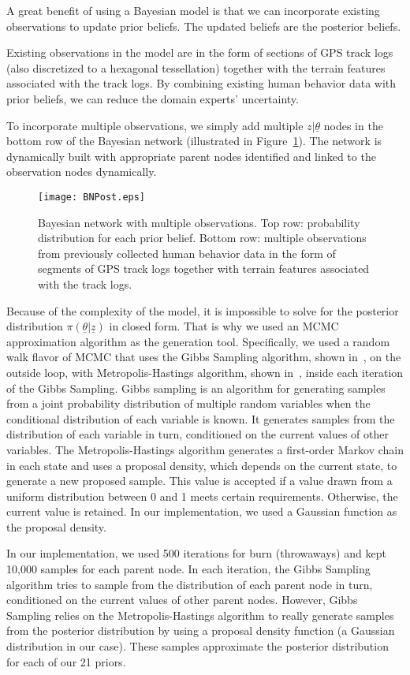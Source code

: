 \documentclass[smallextended,natbib]{svjour3}
\begin{document}
A great benefit of using a Bayesian model is that we can incorporate existing observations to update prior beliefs. The updated beliefs are the posterior beliefs.

Existing observations in the model are in the form of sections of GPS track logs (also discretized to a hexagonal tessellation) together with the terrain features associated with the track logs. By combining existing human behavior data with prior beliefs, we can reduce the domain experts' uncertainty.

To incorporate multiple observations, we simply add multiple $z|\underline{\theta}$ nodes in the bottom row of the Bayesian network (illustrated in Figure~\ref{BNPost}). The network is dynamically built with appropriate parent nodes identified and linked to the observation nodes dynamically.
\begin{figure}
\centering
\texttt{[image: BNPost.eps]}
\caption{Bayesian network with multiple observations. Top row: probability distribution for each prior belief. Bottom row: multiple observations from previously collected human behavior data in the form of segments of GPS track logs together with terrain features associated with the track logs.}
\label{BNPost}
\end{figure}

Because of the complexity of the model, it is impossible to solve for the posterior distribution $\pi(\underline{\theta}|\underline{z})$ in closed form. That is why we used an MCMC approximation algorithm as the generation tool. Specifically, we used a random walk flavor of MCMC that uses the Gibbs Sampling algorithm, shown in~\cite{textbook}, on the outside loop, with Metropolis-Hastings algorithm, shown in~\cite{textbook}, inside each iteration of the Gibbs Sampling. Gibbs sampling is an algorithm for generating samples from a joint probability distribution of multiple random variables when the conditional distribution of each variable is known. It generates samples from the distribution of each variable in turn, conditioned on the current values of other variables. The Metropolis-Hastings algorithm generates a first-order Markov chain in each state and uses a proposal density, which depends on the current state, to generate a new proposed sample. This value is accepted if a value drawn from a uniform distribution between 0 and 1 meets certain requirements. Otherwise, the current value is retained. In our implementation, we used a Gaussian function as the proposal density.

In our implementation, we used 500 iterations for burn (throwaways) and kept 10,000 samples for each parent node. In each iteration, the Gibbs Sampling algorithm tries to sample from the distribution of each parent node in turn, conditioned on the current values of other parent nodes. However, Gibbs Sampling relies on the Metropolis-Hastings algorithm to really generate samples from the posterior distribution by using a proposal density function (a Gaussian distribution in our case). These samples approximate the posterior distribution for each of our 21 priors. 
\end{document}
